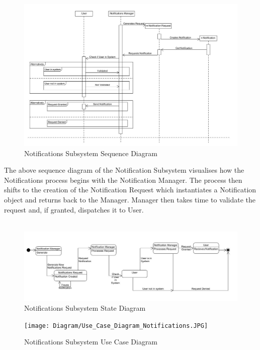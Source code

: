 \documentclass{article}
\begin{document}
				\begin{figure}[h!]
					\includegraphics[scale=0.5]{Diagrams/Sequence_Diagram_Notifications.JPG}
					\caption{Notifications Subsystem Sequence Diagram}	
				\end{figure}
				{The above sequence diagram of the Notification Subsystem visualises how the Notifications process begins with the Notification Manager. The process then shifts to the creation of the Notification Request which instantiates a Notification object and returns back to the Manager. Manager then takes time to validate the request and, if granted, dispatches it to User.\\\\}
				
				\begin{figure}[h!]
					\includegraphics[scale=0.5]{Diagrams/State_Diagram_Notifications.JPG}
					\caption{Notifications Subsystem State Diagram}	
				\end{figure}
				
				\begin{figure}[h!]
					\texttt{[image: Diagram/Use\_Case\_Diagram\_Notifications.JPG]}
					\caption{Notifications Subsystem Use Case Diagram}	
				\end{figure}
				
\end{document}
